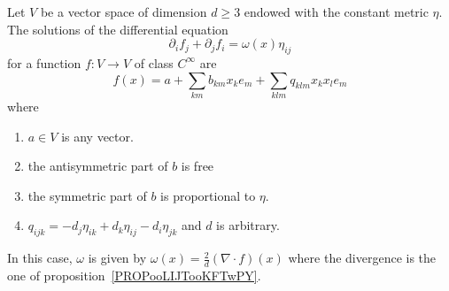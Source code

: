 \begin{lemma}
    Let \( V\) be a vector space of dimension \( d\geq 3\) endowed with the constant metric \( \eta\). The solutions of the differential equation
    \begin{equation}    \label{EQooVBIMooOBKAKQ}
        \partial_if_j+\partial_jf_i=\omega(x)\eta_{ij}
    \end{equation}
    for a function \( f\colon V\to V\) of class \(  C^{\infty}\) are
    \begin{equation}    \label{EQooEFOMooUhcgfT}
        f(x)=a+\sum_{km}b_{km}x_ke_m+\sum_{klm}q_{klm}x_kx_le_m
    \end{equation}
    where
    \begin{enumerate}
        \item
            \( a\in V\) is any vector.
        \item
            the antisymmetric part of \( b\) is free
        \item
            the symmetric part of \( b\) is proportional to \( \eta\).
        \item
            \( q_{ijk}=-d_j\eta_{ik}+d_k\eta_{ij}-d_i\eta_{jk}\) and \( d\) is arbitrary.
    \end{enumerate}
    In this case, \( \omega\) is given by \( \omega(x)=\frac{ 2 }{ d }(\nabla\cdot f)(x)\) where the divergence is the one of proposition~\ref{PROPooLIJTooKFTwPY}.
\end{lemma}

